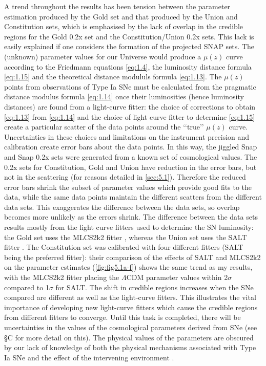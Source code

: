A trend throughout the results has been tension between the parameter estimation produced by the Gold set and that produced by the Union and Constitution sets, which is emphasised by the lack of overlap in the credible regions for the Gold 0.2x set and the Constitution/Union 0.2x sets. This lack is easily explained if one considers the formation of the projected SNAP sets. The (unknown) parameter values for our Universe would produce a $\mu(z)$ curve according to the Friedmann equations \cref{eq:1.4}, the luminosity distance formula \cref{eq:1.15} and the theoretical distance modululs formula \cref{eq:1.13}. The $\mu(z)$ points from observations of Type Ia SNe must be calculated from the pragmatic distance modulus formula \cref{eq:1.14} once their luminosities (hence luminosity distances) are found from a light-curve fitter: the choice of corrections to obtain \cref{eq:1.13} from \cref{eq:1.14} and the choice of light curve fitter to determine \cref{eq:1.15} create a particular scatter of the data points around the \lq\lq{}true\rq\rq{} $\mu(z)$ curve. Uncertainties in these choices and limitations on the instrument precision and calibration create error bars about the data points. In this way, the jiggled Snap and Snap 0.2x sets were generated from a known set of cosmological values. The 0.2x sets for Constitution, Gold and Union have reduction in the error bars, but not in the scattering (for reasons detailed in \cref{sec:5.1}). Therefore the reduced error bars shrink the subset of parameter values which provide good fits to the data, while the same data points maintain the different scatters from the different data sets. This exaggerates the difference between the data sets, so overlap becomes more unlikely as the errors shrink. The difference between the data sets results mostly from the light curve fitters used to determine the SN luminosity: the Gold set uses the MLCS2k2 fitter \cite{Riess2007}, whereas the Union set uses the SALT fitter \cite{Kowalski2008}. The Constitution set was calibrated with four different fitters (SALT being the preferred fitter): their comparison of the effects of SALT and MLCS2k2 on the parameter estimates (\cref{fig:fig5.1a-f}) shows the same trend as my results, with the MLCS2k2 fitter placing the $\Lambda$CDM parameter values within 2$\sigma$ compared to 1$\sigma$ for SALT. The shift in credible regions increases when the SNe compared are different as well as the light-curve fitters. This illustrates the vital importance of developing new light-curve fitters which cause the credible regions from different fitters to converge. Until this task is completed, there will be uncertainties in the values of the cosmological parameters derived from SNe (see §C for more detail on this). The physical values of the parameters are obscured by our lack of knowledge of both the physical mechanisms associated with Type Ia SNe and the effect of the intervening environment \cite{Leibundgut2009}.

